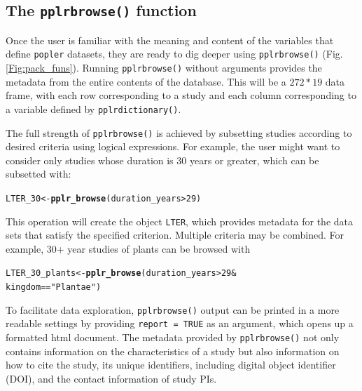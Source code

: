 \documentclass{article}\usepackage[]{graphicx}\usepackage[]{color}
\makeatletter
\newcommand{\hlnum}[1]{\textcolor[rgb]{0.686,0.059,0.569}{#1}}%
\newcommand{\hlstr}[1]{\textcolor[rgb]{0.192,0.494,0.8}{#1}}%
\newcommand{\hlopt}[1]{\textcolor[rgb]{0,0,0}{#1}}%
\newcommand{\hlstd}[1]{\textcolor[rgb]{0.345,0.345,0.345}{#1}}%
\newcommand{\hlkwb}[1]{\textcolor[rgb]{0.69,0.353,0.396}{#1}}%
\newcommand{\hlkwd}[1]{\textcolor[rgb]{0.737,0.353,0.396}{\textbf{#1}}}%
\newenvironment{kframe}{%
 \def\at@end@of@kframe{}%
 \ifinner\ifhmode%
  \def\at@end@of@kframe{\end{minipage}}%
  \begin{minipage}{\columnwidth}%
 \fi\fi%
 \def\FrameCommand##1{\hskip\@totalleftmargin \hskip-\fboxsep
 \colorbox{shadecolor}{##1}\hskip-\fboxsep
     \hskip-\linewidth \hskip-\@totalleftmargin \hskip\columnwidth}%
 \MakeFramed {\advance\hsize-\width
   \@totalleftmargin\z@ \linewidth\hsize
   \@setminipage}}%
 {\par\unskip\endMakeFramed%
 \at@end@of@kframe}
\newenvironment{knitrout}{}{} %
\makeatother
\begin{document}
\subsection*{The \texttt{pplr\textunderscore browse()} function}
Once the user is familiar with the meaning and content of the variables that define \texttt{popler} datasets, they are ready to dig deeper using \texttt{pplr\textunderscore browse()} (Fig. \ref{Fig:pack_funs}). Running \texttt{pplr\textunderscore browse()} without arguments provides the metadata from the entire contents of the database. This will be a $272 * 19$ data frame, with each row corresponding to a study and each column corresponding to a variable defined by \texttt{pplr\textunderscore dictionary()}.

The full strength of \texttt{pplr\textunderscore browse()} is achieved by subsetting studies according to desired criteria using logical expressions. For example, the user might want to consider only studies whose duration is 30 years or greater, which can be subsetted with:
\begin{knitrout}
\color{fgcolor}\begin{kframe}
\begin{alltt}
\hlstd{LTER_30} \hlkwb{<-} \hlkwd{pplr_browse}\hlstd{( duration_years} \hlopt{>} \hlnum{29}\hlstd{)}
\end{alltt}
\end{kframe}
\end{knitrout}
This operation will create the object \texttt{LTER}, which provides metadata for the data sets that satisfy the specified criterion. Multiple criteria may be combined. For example, 30+ year studies of plants can be browsed with
\begin{knitrout}
\color{fgcolor}\begin{kframe}
\begin{alltt}
\hlstd{LTER_30_plants} \hlkwb{<-} \hlkwd{pplr_browse}\hlstd{( duration_years} \hlopt{>} \hlnum{29} \hlopt{&}
                               \hlstd{kingdom} \hlopt{==} \hlstr{"Plantae"}\hlstd{)}
\end{alltt}
\end{kframe}
\end{knitrout}
To facilitate data exploration, \texttt{pplr\textunderscore browse()} output can be printed in a more readable settings by providing \texttt{report = TRUE} as an argument, which opens up a formatted html document. The metadata provided by \texttt{pplr\textunderscore browse()} not only contains information on the characteristics of a study but also information on how to cite the study, its unique identifiers, including digital object identifier (DOI), and the contact information of study PIs. 
\end{document}
